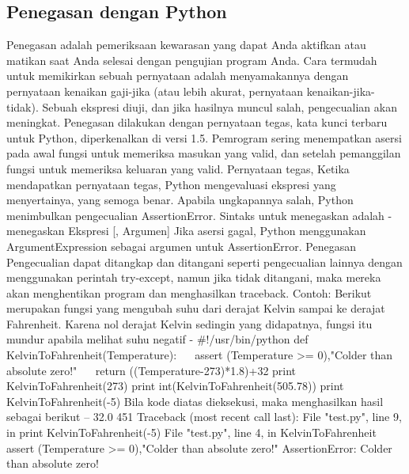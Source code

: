 \subsection{Penegasan dengan Python}
Penegasan adalah pemeriksaan kewarasan yang dapat Anda aktifkan atau matikan saat Anda selesai dengan pengujian program Anda.
Cara termudah untuk memikirkan sebuah pernyataan adalah menyamakannya dengan pernyataan kenaikan gaji-jika (atau lebih akurat, pernyataan kenaikan-jika-tidak). Sebuah ekspresi diuji, dan jika hasilnya muncul salah, pengecualian akan meningkat.
Penegasan dilakukan dengan pernyataan tegas, kata kunci terbaru untuk Python, diperkenalkan di versi 1.5.
Pemrogram sering menempatkan asersi pada awal fungsi untuk memeriksa masukan yang valid, dan setelah pemanggilan fungsi untuk memeriksa keluaran yang valid.
Pernyataan tegas, Ketika mendapatkan pernyataan tegas, Python mengevaluasi ekspresi yang menyertainya, yang semoga benar. Apabila ungkapannya salah, Python menimbulkan pengecualian AssertionError.
Sintaks untuk menegaskan adalah - menegaskan Ekspresi [, Argumen] 
Jika asersi gagal, Python menggunakan ArgumentExpression sebagai argumen untuk AssertionError. Penegasan Pengecualian dapat ditangkap dan ditangani seperti pengecualian lainnya dengan menggunakan perintah try-except, namun jika tidak ditangani, maka mereka akan menghentikan program dan menghasilkan traceback.
Contoh: 
Berikut merupakan fungsi yang mengubah suhu dari derajat Kelvin sampai ke derajat Fahrenheit. Karena nol derajat Kelvin sedingin yang didapatnya, fungsi itu mundur apabila melihat suhu negatif -
 $  \#  $!/usr/bin/python
def KelvinToFahrenheit(Temperature): 
~~ assert (Temperature >= 0),"Colder than absolute zero!" 
~~ return ((Temperature-273)*1.8)+32 
print KelvinToFahrenheit(273) 
print int(KelvinToFahrenheit(505.78)) 
print KelvinToFahrenheit(-5) 
Bila kode diatas dieksekusi, maka menghasilkan hasil sebagai berikut – 
32.0 
451 
Traceback (most recent call last): 
File "test.py", line 9, in  
print KelvinToFahrenheit(-5) 
File "test.py", line 4, in KelvinToFahrenheit 
assert (Temperature >= 0),"Colder than absolute zero!" 
AssertionError: Colder than absolute zero! 


